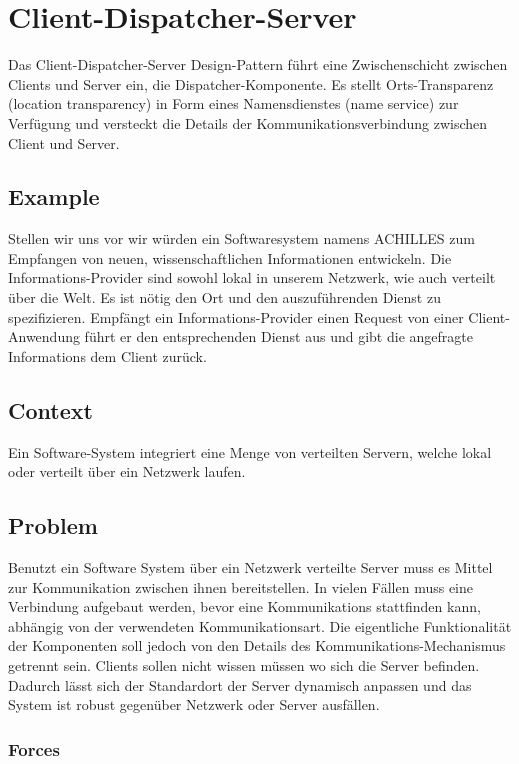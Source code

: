 \section{Client-Dispatcher-Server}


Das Client-Dispatcher-Server Design-Pattern führt eine Zwischenschicht zwischen Clients und Server ein, die Dispatcher-Komponente. Es stellt Orts-Transparenz (location transparency) in Form eines Namensdienstes (name service) zur Verfügung und versteckt die Details der Kommunikationsverbindung zwischen Client und Server.

\subsection*{Example}


Stellen wir uns vor wir würden ein Softwaresystem namens ACHILLES zum Empfangen von neuen, wissenschaftlichen Informationen entwickeln. Die Informations-Provider sind sowohl lokal in unserem Netzwerk, wie auch verteilt über die Welt. Es ist nötig den Ort und den auszuführenden Dienst zu spezifizieren. Empfängt ein Informations-Provider einen Request von einer Client-Anwendung führt er den entsprechenden Dienst aus und gibt die angefragte Informations dem Client zurück.

\subsection*{Context}


Ein Software-System integriert eine Menge von verteilten Servern, welche lokal oder verteilt über ein Netzwerk laufen.

\subsection*{Problem}


Benutzt ein Software System über ein Netzwerk verteilte Server muss es Mittel zur Kommunikation zwischen ihnen bereitstellen. In vielen Fällen muss eine Verbindung aufgebaut werden, bevor eine Kommunikations stattfinden kann, abhängig von der verwendeten Kommunikationsart. Die eigentliche Funktionalität der Komponenten soll jedoch von den Details des Kommunikations-Mechanismus getrennt sein. Clients sollen nicht wissen müssen wo sich die Server befinden. Dadurch lässt sich der Standardort der Server dynamisch anpassen und das System ist robust gegenüber Netzwerk oder Server ausfällen.

\subsubsection*{Forces}


